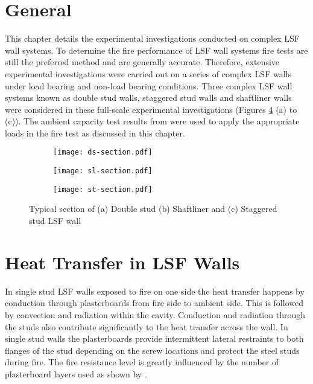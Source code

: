\section{General}
This chapter details the experimental investigations conducted on complex LSF wall systems. To determine the fire performance of LSF wall systems fire tests are still the preferred method and are generally accurate. Therefore, extensive experimental investigations were carried out on a series of complex LSF walls under load bearing and non-load bearing conditions. Three complex LSF wall systems known as double stud walls, staggered stud walls and shaftliner walls were considered in these full-scale experimental investigations (Figures \ref{fig:typical-complex-section} (a) to (c)). The ambient capacity test results from  were used to apply the appropriate loads in the fire test as discussed in this chapter.
\begin{figure}[!htbp]
	\centering
	\begin{subfigure}[b]{0.2\textwidth}
		\centering
		\texttt{[image: ds-section.pdf]}
		\caption{}
		\label{subfig:ds-section}
	\end{subfigure}
	\begin{subfigure}[b]{0.2\textwidth}
		\centering
		\texttt{[image: sl-section.pdf]}
		\caption{}
		\label{subfig:sl-section}
	\end{subfigure}
	\begin{subfigure}[b]{0.3\textwidth}
		\centering
		\texttt{[image: st-section.pdf]}
		\caption{}
		\label{subfig:st-section}
	\end{subfigure}
	   \caption{Typical section of (a) Double stud (b) Shaftliner and (c) Staggered stud LSF wall}
	   \label{fig:typical-complex-section}
\end{figure}

\section{Heat Transfer in LSF Walls}

In single stud LSF walls exposed to fire on one side the heat transfer happens by conduction through plasterboards from fire side to ambient side. This is followed by convection and radiation within the cavity. Conduction and radiation through the studs also contribute significantly to the heat transfer across the wall. In single stud walls the plasterboards provide intermittent lateral restraints to both flanges of the stud depending on the screw locations and protect the steel studs during fire. The fire resistance level is greatly influenced by the number of plasterboard layers used as shown by \citet{Kodur2006,Ariyanayagam2016}. 

